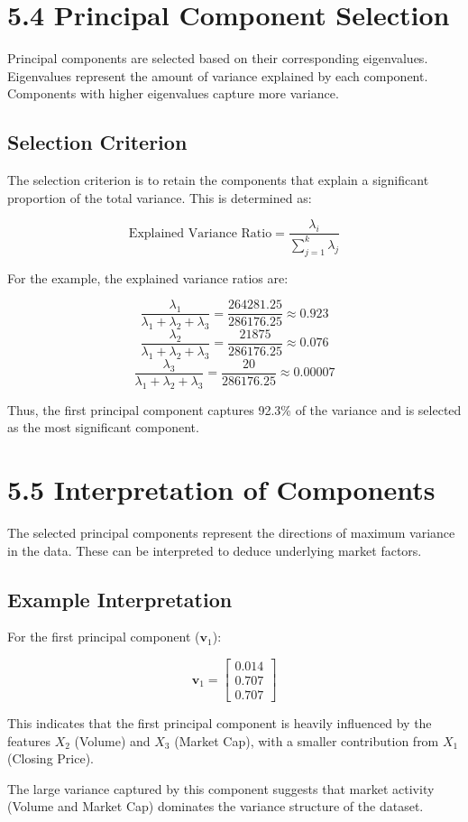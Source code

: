 \documentclass{article}
\begin{document}
\section*{5.4 Principal Component Selection}

Principal components are selected based on their corresponding eigenvalues. Eigenvalues represent the amount of variance explained by each component. Components with higher eigenvalues capture more variance.

\subsection*{Selection Criterion}

The selection criterion is to retain the components that explain a significant proportion of the total variance. This is determined as:

\[
\text{Explained Variance Ratio} = \frac{\lambda_i}{\sum_{j=1}^k \lambda_j}
\]

For the example, the explained variance ratios are:

\[
\frac{\lambda_1}{\lambda_1 + \lambda_2 + \lambda_3} = \frac{264281.25}{286176.25} \approx 0.923
\]
\[
\frac{\lambda_2}{\lambda_1 + \lambda_2 + \lambda_3} = \frac{21875}{286176.25} \approx 0.076
\]
\[
\frac{\lambda_3}{\lambda_1 + \lambda_2 + \lambda_3} = \frac{20}{286176.25} \approx 0.00007
\]

Thus, the first principal component captures 92.3\% of the variance and is selected as the most significant component.

\section*{5.5 Interpretation of Components}

The selected principal components represent the directions of maximum variance in the data. These can be interpreted to deduce underlying market factors.

\subsection*{Example Interpretation}

For the first principal component (\(\mathbf{v}_1\)):

\[
\mathbf{v}_1 = 
\begin{bmatrix}
0.014 \\
0.707 \\
0.707
\end{bmatrix}
\]

This indicates that the first principal component is heavily influenced by the features \(X_2\) (Volume) and \(X_3\) (Market Cap), with a smaller contribution from \(X_1\) (Closing Price).

The large variance captured by this component suggests that market activity (Volume and Market Cap) dominates the variance structure of the dataset.
\end{document}
